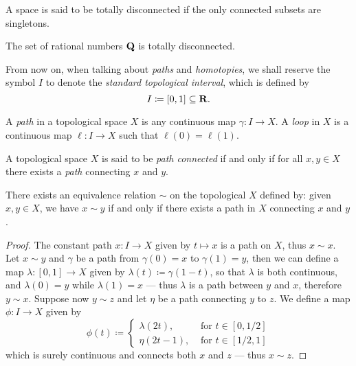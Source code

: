 \begin{definition}
\label{def:totally-disconnected}
A space is said to be totally disconnected if the only connected subsets are
singletons.
\end{definition}

\begin{example}
\label{exp:Q-is-totally-disconnected}
The set of rational numbers \(\mathbf{Q}\) is totally disconnected.
\end{example}

\begin{notation}
From now on, when talking about \emph{paths} and \emph{homotopies}, we shall
reserve the symbol \(I\) to denote the \emph{standard topological interval},
which is defined by
\[
  I \coloneq [0, 1] \subseteq \mathbf{R}.
\]
\end{notation}

\begin{definition}
\label{def:path-loop}
A \emph{path} in a topological space \(X\) is any continuous map \(\gamma: I \to
X\). A \emph{loop} in \(X\) is a continuous map \(\ell: I \to X\) such that
\(\ell(0) = \ell(1)\).
\end{definition}

\begin{definition}
\label{def:path-connected}
A topological space \(X\) is said to be \emph{path connected} if and only if
for all \(x, y \in X\) there exists a \emph{path} connecting \(x\) and \(y\).
\end{definition}

\begin{proposition}
\label{prop:path-connected-equiv-relation}
There exists an equivalence relation \(\sim\) on the topological \(X\) defined
by: given \(x, y \in X\), we have \(x \sim y\) if and only if there exists a
path in \(X\) connecting \(x\) and \(y\).
\end{proposition}

\begin{proof}
The constant path \(x: I \to X\) given by \(t \mapsto x\) is a path on
\(X\), thus \(x \sim x\). Let \(x \sim y\) and \(\gamma\) be a path from
\(\gamma(0) = x\) to \(\gamma(1) = y\), then we can define a map \(\lambda: [0,
1] \to X\) given by \(\lambda(t) \coloneq \gamma(1 - t)\), so that \(\lambda\)
is both continuous, and \(\lambda(0) = y\) while \(\lambda(1) = x\) --- thus
\(\lambda\) is a path between \(y\) and \(x\), therefore \(y \sim x\). Suppose
now \(y \sim z\) and let \(\eta\) be a path connecting \(y\) to \(z\). We
define a map \(\phi: I \to X\) given by
\[
  \phi(t) \coloneq
  \begin{cases}
    \lambda(2t), &\text{ for } t \in [0, 1/2] \\
    \eta(2t - 1), &\text{ for } t \in [1/2, 1]
  \end{cases}
\]
which is surely continuous and connects both \(x\) and \(z\) --- thus \(x \sim
z\).
\end{proof}

